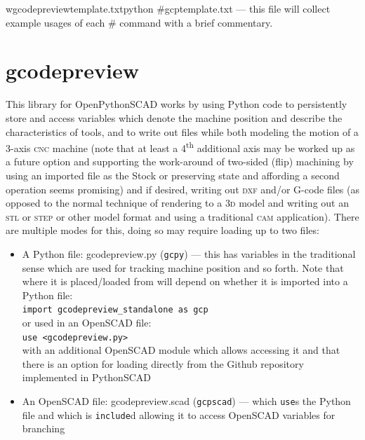 \documentclass{ltxdoc}
\begin{document}
\lstset{firstnumber=1}%
\begin{writecode}{w}{gcodepreviewtemplate.txt}{python}
#gcptemplate.txt --- this file will collect example usages of each 
#                    command with a brief commentary.

\end{writecode}
\addtocounter{gcptmpl}{3}

\section{gcodepreview}

This library for OpenPythonSCAD works by using Python code to persistently store and access variables which denote the machine position and describe the characteristics of tools, and to write out files while both modeling the motion of a 3-axis \textsc{cnc} machine (note that at least a 4\textsuperscript{th} additional axis may be worked up as a future option and supporting the work-around of two-sided (flip) machining by using an imported file as the Stock or preserving state and affording a second operation seems promising) and if desired, writing out \textsc{dxf} and/or G-code files (as opposed to the normal technique of rendering to a \textsc{3d} model and writing out an \textsc{stl} or \textsc{step} or other model format and using a traditional \textsc{cam} application). There are multiple modes for this, doing so may require loading up to two files:

\begin{itemize}
\item A Python file: gcodepreview.py (\texttt{gcpy}) --- this has
      variables in the traditional sense which are used for tracking machine position and so forth. 
      Note that where it is placed/loaded from will depend on whether it is imported into
      a Python file:\\
      \verb|import gcodepreview_standalone as gcp|\\ 
      or used in an OpenSCAD file:\\
      \verb|use <gcodepreview.py>|\\
      with an additional OpenSCAD module which allows accessing it and that there
      is an option for loading directly from the Github repository implemented in
      PythonSCAD
\item An OpenSCAD file: gcodepreview.scad (\texttt{gcpscad}) --- which \verb|use|s the Python file 
      and which is \texttt{include}d allowing it to access OpenSCAD variables for branching   
\end{itemize}
\end{document}
